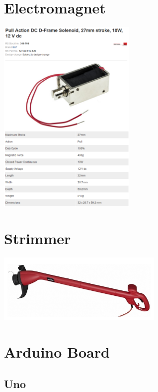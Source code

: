 \documentclass[11pt]{article}
\begin{document}
\begin{appendices}
\section{Electromagnet}
\label{appendix:electromagnet}

\begin{center}
\includegraphics[width=0.5\textwidth]{images/solenoid.png}
\label{figure:solenoid}
\end{center}

\section{Strimmer}
\label{appendix:strimmer}

\begin{center}
\includegraphics[width=0.6\textwidth]{images/strimmer.png}
\label{figure:strimmer}
\end{center}

\section{Arduino Board}
\subsection{Uno}
\label{appendix:arduinoUno}


\end{appendices}
\end{document}
